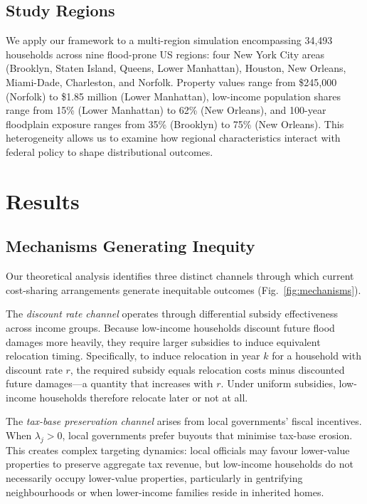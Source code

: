 \documentclass[preprint,12pt,authoryear]{elsarticle}
\begin{document}
\subsection{Study Regions}

We apply our framework to a multi-region simulation encompassing 34,493 households across nine flood-prone US regions: four New York City areas (Brooklyn, Staten Island, Queens, Lower Manhattan), Houston, New Orleans, Miami-Dade, Charleston, and Norfolk. Property values range from \$245,000 (Norfolk) to \$1.85 million (Lower Manhattan), low-income population shares range from 15\% (Lower Manhattan) to 62\% (New Orleans), and 100-year floodplain exposure ranges from 35\% (Brooklyn) to 75\% (New Orleans). This heterogeneity allows us to examine how regional characteristics interact with federal policy to shape distributional outcomes.


\section{Results}\label{sec:results}

\subsection{Mechanisms Generating Inequity}

Our theoretical analysis identifies three distinct channels through which current cost-sharing arrangements generate inequitable outcomes (Fig.~\ref{fig:mechanisms}).

The \textit{discount rate channel} operates through differential subsidy effectiveness across income groups. Because low-income households discount future flood damages more heavily, they require larger subsidies to induce equivalent relocation timing. Specifically, to induce relocation in year $k$ for a household with discount rate $r$, the required subsidy equals relocation costs minus discounted future damages---a quantity that increases with $r$. Under uniform subsidies, low-income households therefore relocate later or not at all.

The \textit{tax-base preservation channel} arises from local governments' fiscal incentives. When $\lambda_j > 0$, local governments prefer buyouts that minimise tax-base erosion. This creates complex targeting dynamics: local officials may favour lower-value properties to preserve aggregate tax revenue, but low-income households do not necessarily occupy lower-value properties, particularly in gentrifying neighbourhoods or when lower-income families reside in inherited homes.
\end{document}
